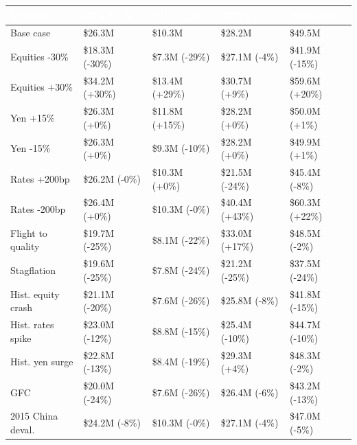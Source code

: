 \documentclass[11pt,letterpaper]{article}
\begin{document}
{\scriptsize\setlength{\LTpre}{4pt}\setlength{\LTpost}{6pt}
\begin{longtable}{>{\raggedright\arraybackslash}p{}>{\raggedright\arraybackslash}p{}>{\raggedright\arraybackslash}p{}>{\raggedright\arraybackslash}p{}>{\raggedright\arraybackslash}p{}}
\toprule
\rowcolor{navy}\textbf{\textcolor{white}{Scenario}} & \textbf{\textcolor{white}{CPTY\_A}} & \textbf{\textcolor{white}{CPTY\_B}} & \textbf{\textcolor{white}{CPTY\_C}} & \textbf{\textcolor{white}{Portfolio}} \\
\endhead
Base case & \$26.3M & \$10.3M & \$28.2M & \$49.5M \\
\rowcolor{gray!9}Equities -30\% & \$18.3M (-30\%) & \$7.3M (-29\%) & \$27.1M (-4\%) & \$41.9M (-15\%) \\
Equities +30\% & \$34.2M (+30\%) & \$13.4M (+29\%) & \$30.7M (+9\%) & \$59.6M (+20\%) \\
\rowcolor{gray!9}Yen +15\% & \$26.3M (+0\%) & \$11.8M (+15\%) & \$28.2M (+0\%) & \$50.0M (+1\%) \\
Yen -15\% & \$26.3M (+0\%) & \$9.3M (-10\%) & \$28.2M (+0\%) & \$49.9M (+1\%) \\
\rowcolor{gray!9}Rates +200bp & \$26.2M (-0\%) & \$10.3M (+0\%) & \$21.5M (-24\%) & \$45.4M (-8\%) \\
Rates -200bp & \$26.4M (+0\%) & \$10.3M (-0\%) & \$40.4M (+43\%) & \$60.3M (+22\%) \\
\rowcolor{gray!9}Flight to quality & \$19.7M (-25\%) & \$8.1M (-22\%) & \$33.0M (+17\%) & \$48.5M (-2\%) \\
Stagflation & \$19.6M (-25\%) & \$7.8M (-24\%) & \$21.2M (-25\%) & \$37.5M (-24\%) \\
\rowcolor{gray!9}Hist. equity crash & \$21.1M (-20\%) & \$7.6M (-26\%) & \$25.8M (-8\%) & \$41.8M (-15\%) \\
Hist. rates spike & \$23.0M (-12\%) & \$8.8M (-15\%) & \$25.4M (-10\%) & \$44.7M (-10\%) \\
\rowcolor{gray!9}Hist. yen surge & \$22.8M (-13\%) & \$8.4M (-19\%) & \$29.3M (+4\%) & \$48.3M (-2\%) \\
2008 GFC & \$20.0M (-24\%) & \$7.6M (-26\%) & \$26.4M (-6\%) & \$43.2M (-13\%) \\
\rowcolor{gray!9}2015 China deval. & \$24.2M (-8\%) & \$10.3M (-0\%) & \$27.1M (-4\%) & \$47.0M (-5\%) \\
\bottomrule
\end{longtable}}
\end{document}

